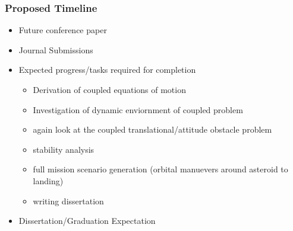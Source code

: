 
\begin{frame}[t]\frametitle{Proposed Timeline}
    
\begin{itemize}
    \item Future conference paper
    \item Journal Submissions
    \item Expected progress/tasks required for completion
    \begin{itemize}
        \item Derivation of coupled equations of motion
        \item Investigation of dynamic enviornment of coupled problem
        \item again look at the coupled translational/attitude obstacle problem
        \item stability analysis
        \item full mission scenario generation (orbital manuevers around asteroid to landing)
        \item writing dissertation
    \end{itemize}
    \item Dissertation/Graduation Expectation
\end{itemize}

\end{frame}